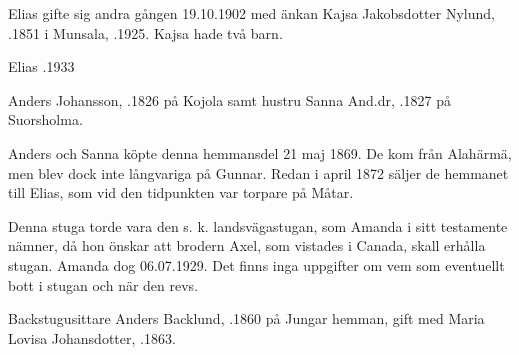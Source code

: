 Elias gifte sig andra gången 19.10.1902 med änkan Kajsa Jakobsdotter Nylund, .1851 i Munsala, .1925. Kajsa hade två barn.
\begin{jhchildren}
  \item {}
  \item {}
\end{jhchildren}

Elias .1933


Anders Johansson, .1826 på Kojola samt hustru Sanna And.dr, .1827 på Suorsholma.
\begin{jhchildren}
  \item {}
  \item {}
  \item {}
\end{jhchildren}

Anders och Sanna köpte denna hemmansdel 21 maj 1869. De kom från Alahärmä, men blev dock inte långvariga på Gunnar. Redan i april 1872 säljer de hemmanet till Elias, som vid den tidpunkten var torpare på Måtar.





Denna stuga torde vara den s. k. landsvägastugan, som Amanda i sitt testamente nämner, då hon önskar att brodern Axel, som vistades i Canada, skall erhålla stugan. Amanda dog 06.07.1929. Det finns inga uppgifter om vem som eventuellt bott i stugan och när den revs.


Backstugusittare Anders Backlund, .1860 på Jungar hemman, gift med Maria Lovisa Johansdotter, .1863.
\begin{jhchildren}
  \item {}
  \item {}
  \item {}
  \item {}
  \item {}
\end{jhchildren}

